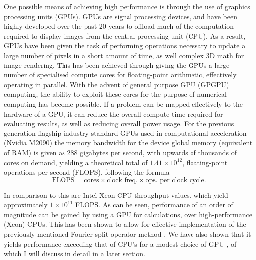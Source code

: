 One possible means of achieving high performance is through the use of graphics processing units (GPUs). GPUs are signal processing devices, and have been highly developed over the past 20 years to offload much of the computation required to display images from the central processing unit (CPU). As a result, GPUs have been given the task of performing operations necessary to update a large number of pixels in a short amount of time, as well complex 3D math for image rendering. This has been achieved through giving the GPUs a large number of specialised compute cores for floating-point arithmetic, effectively operating in parallel. With the advent of general purpose GPU (GPGPU) computing, the ability to exploit these cores for the purpose of numerical computing has become possible. If a problem can be mapped effectively to the hardware of a GPU, it can reduce the overall compute time required for evaluating results, as well as reducing overall power usage. For the previous generation flagship industry standard GPUs used in computational acceleration (Nvidia M2090) the memory bandwidth for the device global memory (equivalent of RAM) is given as 288 gigabytes per second, with upwards of thousands of cores on demand, yielding a theoretical total of $1.41\times10^{12}$, floating-point operations per second (FLOPS), following the formula
\begin{equation}
    \text{FLOPS} = \text{cores}\times\text{clock freq.}\times\text{ops. per clock cycle}.
\end{equation}

In comparison to this are Intel Xeon CPU throughput values, which yield approximately $1\times10^{11}$ FLOPS. As can be seen, performance of an order of magnitude can be gained by using a GPU for calculations, over high-performance (Xeon) CPUs. This has been shown to allow for effective implementation of the previously mentioned Fourier split-operator method \cite{Num:Bauke_cpc_2011}. We have also shown that it yields performance exceeding that of CPU's for a modest choice of GPU \cite{AO:Morgan_ORiordan_pra_2013}, of which I will discuss in detail in a later section.

